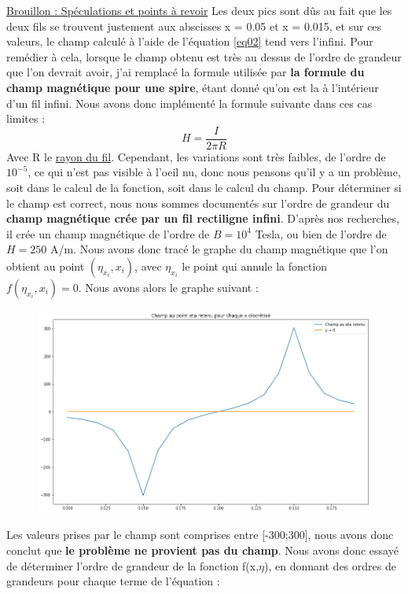 \documentclass{article}
\begin{document}
\underline{Brouillon : Spéculations et points à revoir}
Les deux pics sont dûs au fait que les deux fils se trouvent justement aux abscisses x = 0.05 et x = 0.015, et sur ces valeurs, le champ calculé à l'aide de l'équation \eqref{eq02} tend vers l'infini. Pour remédier à cela, lorsque le champ obtenu est très au dessus de l'ordre de grandeur que l'on devrait avoir, j'ai remplacé la formule utilisée par \textbf{la formule du champ magnétique pour une spire}, étant donné qu'on est la à l'intérieur d'un fil infini. Nous avons donc implémenté la formule suivante dans ces cas limites : 
\begin{equation}
H = \frac{I}{2\pi R}
\label{eq06}
\end{equation}
Avec R le \underline{rayon du fil}.
\newline
Cependant, les variations sont très faibles, de l'ordre de $10^{-5}$, ce qui n'est pas visible à l'oeil nu, donc nous pensons qu'il y a un problème, soit dans le calcul de la fonction, soit dans le calcul du champ.
\newline
Pour déterminer si le champ est correct, nous nous sommes documentés sur l'ordre de grandeur du \textbf{champ magnétique crée par un fil rectiligne infini}. D'après nos recherches, il crée un champ magnétique de l'ordre de $ B = 10^{4}$ Tesla, ou bien de l'ordre de $H = 250$ A/m.
\newline
Nous avons donc tracé le graphe du champ magnétique que l'on obtient au point $(\eta_{x_{i}},x_{i})$, avec $\eta_{x_{i}}$ le point qui annule la fonction $f(\eta_{x_{i}},x_{i}) = 0$. Nous avons alors le graphe suivant :
\begin{figure}[h]
	\centering
    \includegraphics[width=.5\linewidth]{Champ.png}
    
\end{figure}
Les valeurs prises par le champ sont comprises entre [-300;300], nous avons donc conclut que \textbf{le problème ne provient pas du champ}.
\newline\newline
Nous avons donc essayé de déterminer l'ordre de grandeur de la fonction f(x,$\eta$), en donnant des ordres de grandeurs pour chaque terme de l'équation :
\end{document}
